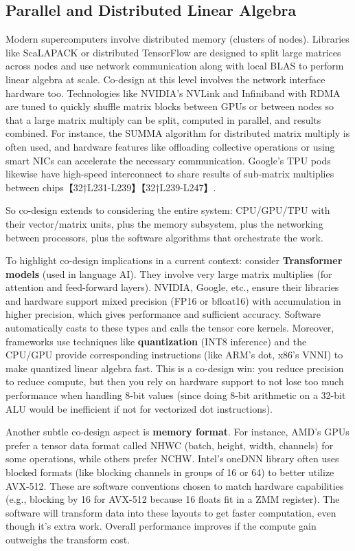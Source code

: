 \subsection{Parallel and Distributed Linear Algebra}  
Modern supercomputers involve distributed memory (clusters of nodes). Libraries like ScaLAPACK or distributed TensorFlow are designed to split large matrices across nodes and use network communication along with local BLAS to perform linear algebra at scale. Co-design at this level involves the network interface hardware too. Technologies like NVIDIA’s NVLink and Infiniband with RDMA are tuned to quickly shuffle matrix blocks between GPUs or between nodes so that a large matrix multiply can be split, computed in parallel, and results combined. For instance, the SUMMA algorithm for distributed matrix multiply is often used, and hardware features like offloading collective operations or using smart NICs can accelerate the necessary communication. Google’s TPU pods likewise have high-speed interconnect to share results of sub-matrix multiplies between chips【32†L231-L239】【32†L239-L247】.

So co-design extends to considering the entire system: CPU/GPU/TPU with their vector/matrix units, plus the memory subsystem, plus the networking between processors, plus the software algorithms that orchestrate the work.

To highlight co-design implications in a current context: consider \textbf{Transformer models} (used in language AI). They involve very large matrix multiplies (for attention and feed-forward layers). NVIDIA, Google, etc., ensure their libraries and hardware support mixed precision (FP16 or bfloat16) with accumulation in higher precision, which gives performance and sufficient accuracy. Software automatically casts to these types and calls the tensor core kernels. Moreover, frameworks use techniques like \textbf{quantization} (INT8 inference) and the CPU/GPU provide corresponding instructions (like ARM’s dot, x86’s VNNI) to make quantized linear algebra fast. This is a co-design win: you reduce precision to reduce compute, but then you rely on hardware support to not lose too much performance when handling 8-bit values (since doing 8-bit arithmetic on a 32-bit ALU would be inefficient if not for vectorized dot instructions).

Another subtle co-design aspect is \textbf{memory format}. For instance, AMD’s GPUs prefer a tensor data format called NHWC (batch, height, width, channels) for some operations, while others prefer NCHW. Intel’s oneDNN library often uses blocked formats (like blocking channels in groups of 16 or 64) to better utilize AVX-512. These are software conventions chosen to match hardware capabilities (e.g., blocking by 16 for AVX-512 because 16 floats fit in a ZMM register). The software will transform data into these layouts to get faster computation, even though it’s extra work. Overall performance improves if the compute gain outweighs the transform cost.

